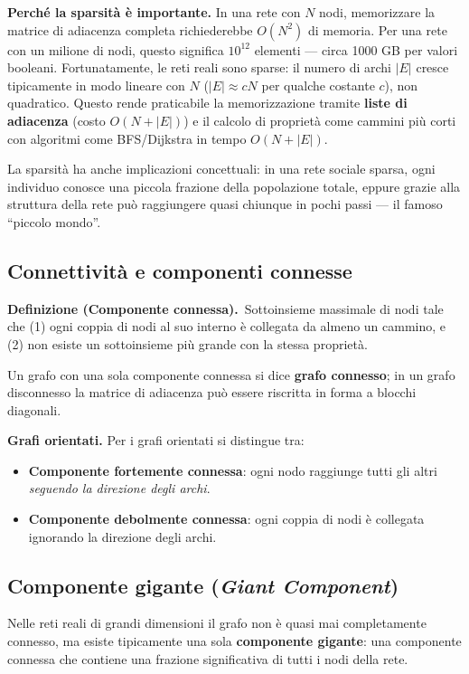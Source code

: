 \documentclass[12pt,a4paper]{article}
\newcommand{\definition}[2]{%
  \vspace{4pt}%
  \noindent\textbf{Definizione (#1).}\ #2\par\vspace{4pt}%
}
\begin{document}
\medskip
\noindent\textbf{Perché la sparsità è importante.}
In una rete con $N$ nodi, memorizzare la matrice di adiacenza completa richiederebbe
$O(N^2)$ di memoria. Per una rete con un milione di nodi, questo significa $10^{12}$
elementi — circa 1000 GB per valori booleani. Fortunatamente, le reti reali sono sparse:
il numero di archi $|E|$ cresce tipicamente in modo lineare con $N$ ($|E| \approx cN$
per qualche costante $c$), non quadratico. Questo rende praticabile la memorizzazione
tramite \textbf{liste di adiacenza} (costo $O(N+|E|)$) e il calcolo di proprietà come
cammini più corti con algoritmi come BFS/Dijkstra in tempo $O(N+|E|)$.

La sparsità ha anche implicazioni concettuali: in una rete sociale sparsa, ogni individuo
conosce una piccola frazione della popolazione totale, eppure grazie alla struttura della
rete può raggiungere quasi chiunque in pochi passi — il famoso ``piccolo mondo''.

\subsection{Connettività e componenti connesse}

\definition{Componente connessa}{Sottoinsieme massimale di nodi tale che (1) ogni coppia di nodi
al suo interno è collegata da almeno un cammino, e (2) non esiste un sottoinsieme più grande
con la stessa proprietà.}

Un grafo con una sola componente connessa si dice \textbf{grafo connesso}; in un grafo
disconnesso la matrice di adiacenza può essere riscritta in forma a blocchi diagonali.

\textbf{Grafi orientati.} Per i grafi orientati si distingue tra:
\begin{itemize}
  \item \textbf{Componente fortemente connessa}: ogni nodo raggiunge tutti gli altri
        \emph{seguendo la direzione degli archi}.
  \item \textbf{Componente debolmente connessa}: ogni coppia di nodi è collegata
        ignorando la direzione degli archi.
\end{itemize}

\subsection{Componente gigante (\textit{Giant Component})}

Nelle reti reali di grandi dimensioni il grafo non è quasi mai completamente connesso,
ma esiste tipicamente una sola \textbf{componente gigante}: una componente connessa che
contiene una frazione significativa di tutti i nodi della rete.
\end{document}
